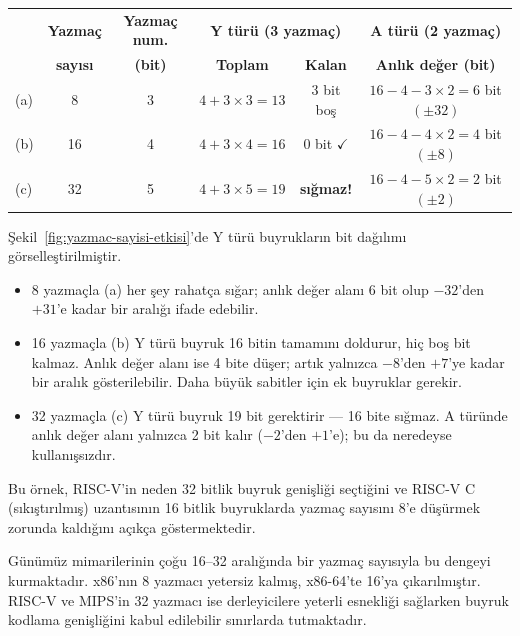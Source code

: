 \begin{ornek}[3.5]
\begin{table}[H]
\centering
\small
\begin{tabular}{lccccc}
\toprule
 & \textbf{Yazmaç} & \textbf{Yazmaç num.} & \multicolumn{2}{c}{\textbf{Y türü (3 yazmaç)}} & \textbf{A türü (2 yazmaç)} \\
 & \textbf{sayısı} & \textbf{(bit)} & \textbf{Toplam} & \textbf{Kalan} & \textbf{Anlık değer (bit)} \\
\midrule
(a) & 8  & 3 & $4 + 3\!\times\!3 = 13$ & 3 bit boş & $16 - 4 - 3\!\times\!2 = 6$ bit $(\pm 32)$ \\
(b) & 16 & 4 & $4 + 3\!\times\!4 = 16$ & 0 bit $\checkmark$ & $16 - 4 - 4\!\times\!2 = 4$ bit $(\pm 8)$ \\
(c) & 32 & 5 & $4 + 3\!\times\!5 = 19$ & \textbf{sığmaz!} & $16 - 4 - 5\!\times\!2 = 2$ bit $(\pm 2)$ \\
\bottomrule
\end{tabular}
\end{table}

Şekil~\ref{fig:yazmac-sayisi-etkisi}'de Y türü buyrukların bit dağılımı görselleştirilmiştir.
\begin{itemize}[nosep]
\item 8 yazmaçla (a) her şey rahatça sığar; anlık değer alanı 6 bit olup $-32$'den $+31$'e kadar bir aralığı ifade edebilir.
\item 16 yazmaçla (b) Y türü buyruk 16 bitin tamamını doldurur, hiç boş bit kalmaz. Anlık değer alanı ise 4 bite düşer; artık yalnızca $-8$'den $+7$'ye kadar bir aralık gösterilebilir. Daha büyük sabitler için ek buyruklar gerekir.
\item 32 yazmaçla (c) Y türü buyruk 19 bit gerektirir --- 16 bite sığmaz. A türünde anlık değer alanı yalnızca 2 bit kalır ($-2$'den $+1$'e); bu da neredeyse kullanışsızdır.
\end{itemize}

Bu örnek, RISC-V'in neden 32 bitlik buyruk genişliği seçtiğini ve RISC-V C (sıkıştırılmış) uzantısının 16 bitlik buyruklarda yazmaç sayısını 8'e düşürmek zorunda kaldığını açıkça göstermektedir.
\end{ornek}

Günümüz mimarilerinin çoğu 16--32 aralığında bir yazmaç sayısıyla bu dengeyi kurmaktadır. x86'nın 8 yazmacı yetersiz kalmış, x86-64'te 16'ya çıkarılmıştır. RISC-V ve MIPS'in 32 yazmacı ise derleyicilere yeterli esnekliği sağlarken buyruk kodlama genişliğini kabul edilebilir sınırlarda tutmaktadır.

